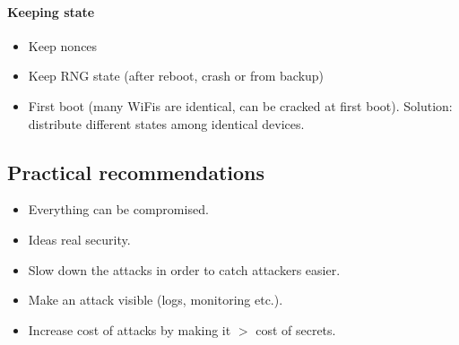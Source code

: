 \paragraph{Keeping state}

\begin{itemize}
	\item Keep nonces
	\item Keep RNG state (after reboot, crash or from backup)
	\item First boot (many WiFis are identical, can be cracked at first boot).
		Solution: distribute different states among identical devices.
\end{itemize}

\subsection{Practical recommendations}

\begin{itemize}
	\item Everything can be compromised.
	\item Ideas real security.
	\item Slow down the attacks in order to catch attackers easier.
	\item Make an attack visible (logs, monitoring etc.).
	\item Increase cost of attacks by making it $>$ cost of secrets.
\end{itemize}
